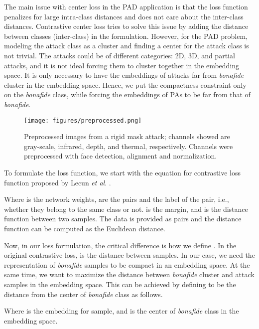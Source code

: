 \documentclass[journal]{IEEEtran}
\begin{document}
The main issue with center loss in the PAD application is that the loss function penalizes for large intra-class distances and does not care about the inter-class distances. Contrastive center loss \cite{qi2017contrastive} tries to solve this issue by adding the distance between classes (inter-class) in the formulation. However, for the PAD problem, modeling the attack class as a cluster and finding a center for the attack class is not trivial. The attacks could be of different categories: 2D, 3D, and partial attacks, and it is not ideal forcing them to cluster together in the embedding space. It is only necessary to have the embeddings of attacks far from \textit{bonafide} cluster in the embedding space. Hence, we put the compactness constraint only on the \textit{bonafide} class, while forcing the embeddings of PAs to be far from that of \textit{bonafide}.

\begin{figure*}[h!]
     \centering
         \texttt{[image: figures/preprocessed.png]}

\caption{Preprocessed images from a rigid mask attack; channels showed are gray-scale, infrared, depth, and thermal, respectively. Channels were preprocessed with face detection, alignment and normalization.}
\label{fig:preprocessed}
\end{figure*}

To formulate the loss function, we start with the equation for contrastive loss function proposed by Lecun \textit{et al}. \cite{hadsell2006dimensionality}.


Where  is the network weights,  are the pairs and  the label of the pair, i.e., whether they belong to the same class or not.  is the margin, and  is the distance function between two samples. The data is provided as pairs  and the distance function  can be computed as the Euclidean distance.



Now, in our loss formulation, the critical difference is how we define . In the original contrastive loss,  is the distance between samples. In our case, we need the representation of \textit{bonafide} samples to be compact in an embedding space. At the same time, we want to maximize the distance between \textit{bonafide} cluster and attack samples in the embedding space. This can be achieved by defining  to be the distance from the center of \textit{bonafide} class as follows.



Where  is the embedding for  sample, and  is the center of \textit{bonafide} class in the embedding space.
\end{document}
